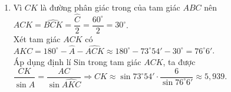 \begin{bt}
{\begin{enumerate}
$$			=\dfrac{(2\sqrt{13})^2+6^2-8^2}{2\cdot 2\sqrt{13}\cdot 6}=\dfrac{\sqrt{13}}{13}\\
			\Rightarrow \widehat{A} \approx 73^\circ 54'.
			$$
			Xét tam giác $ABC$, ta có\\
			$$\widehat{B}=180^\circ - \widehat{A} - \widehat{C} \approx 180^\circ - 73^\circ 54' - 60^\circ = 46^\circ 6'.$$
			\item %
			Vì $CK$ là đường phân giác trong của tam giác $ABC$ nên $\widehat{ACK}=\widehat{BCK}=\dfrac{\widehat{C}}{2}=\dfrac{60^\circ}{2}=30^\circ$.\\
			Xét tam giác $ACK$ có\\
			$\widehat{AKC}=180^\circ - \widehat{A}-\widehat{ACK} \approx 180^\circ - 73^\circ 54'-30^\circ=76^\circ 6'$.\\
			Áp dụng định lí Sin trong tam giác $ACK$, ta được\\
			$\dfrac{CK}{\sin \widehat{A}}=\dfrac{AC}{\sin \widehat{AKC}} \Rightarrow CK \approx \sin 73^\circ 54'\cdot \dfrac{6}{\sin 76^\circ 6'} \approx 5,939$.
		\end{enumerate}
	}
\end{bt}	  

